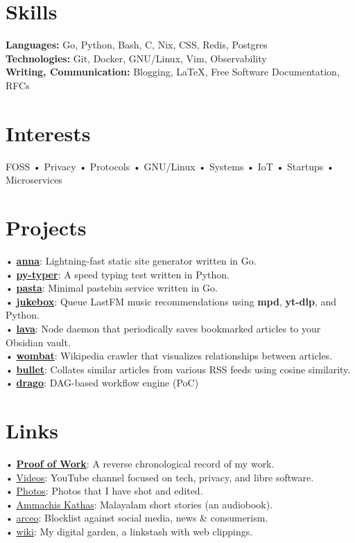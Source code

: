 \documentclass[a4,12pt]{article}
\begin{document}
\section{Skills}
\textbf{Languages:} Go, Python, Bash, C, Nix, CSS, Redis, Postgres \\
\textbf{Technologies:} Git, Docker, GNU/Linux, Vim, Observability \\
\textbf{Writing, Communication:} Blogging, \LaTeX, Free Software Documentation, RFCs

\section{Interests}
FOSS
• Privacy
• Protocols
• GNU/Linux
• Systems
• IoT
• Startups
• Microservices

\section{Projects}
• \textbf{\href{https://github.com/anna-ssg/anna}{anna}}: Lightning-fast static site generator written in Go. \\
• \textbf{\href{https://github.com/polarhive/py-typer}{py-typer}}: A speed typing test written in Python. \\
• \textbf{\href{https://polarhive.net/pasta}{pasta}}: Minimal pastebin service written in Go. \\
• \textbf{\href{https://github.com/polarhive/jukebox}{jukebox}}: Queue LastFM music recommendations using \textbf{mpd}, \textbf{yt-dlp}, and Python. \\
• \textbf{\href{https://polarhive.net/lava}{lava}}: Node daemon that periodically saves bookmarked articles to your Obsidian vault. \\
• \textbf{\href{https://github.com/polarhive/wombat}{wombat}}: Wikipedia crawler that visualizes relationships between articles. \\
• \textbf{\href{https://polarhive.net/bullet}{bullet}}: Collates similar articles from various RSS feeds using cosine similarity. \\
• \textbf{\href{https://github.com/polarhive/drago}{drago}}: DAG-based workflow engine (PoC)

\section{Links}
• \textbf{\href{https://polarhive.net/pow}{Proof of Work}}: A reverse chronological record of my work. \\
• \href{https://polarhive.net/videos}{Videos}: YouTube channel focused on tech, privacy, and libre software.\\
• \href{https://polarhive.net/photos}{Photos}: Photos that I have shot and edited. \\
• \href{https://polarhive.net/ammachiskathas}{Ammachis Kathas}: Malayalam short stories (an audiobook). \\
• \href{https://polarhive.net/arceo}{arceo}: Blocklist against social media, news \& consumerism. \\
• \href{https://polarhive.net/wiki}{wiki}: My digital garden, a linkstash with web clippings.
\end{document}
